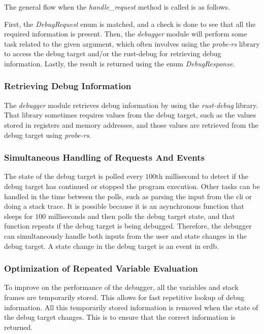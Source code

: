 The general flow when the \emph{handle\_request} method is called is as follows.


First, the \emph{DebugRequest} enum is matched, and a check is done to see that all the required information is present.
Then, the \emph{debugger} module will perform some task related to the given argument, which often involves using the \emph{probe-rs} library to access the debug target and/or the rust-debug for retrieving debug information.
Lastly, the result is returned using the enum \emph{DebugResponse}.



\subsubsection{Retrieving Debug Information}
The \emph{debugger} module retrieves debug information by using the \emph{rust-debug} library.
That library sometimes requires values from the debug target, such as the values stored in registers and memory addresses, and those values are retrieved from the debug target using \emph{probe-rs}.



\subsubsection{Simultaneous Handling of Requests And Events}
The state of the debug target is polled every $100\text{th}$ millisecond to detect if the debug target has continued or stopped the program execution.
Other tasks can be handled in the time between the polls, such as parsing the input from the \acrshort{cli} or doing a stack trace.
It is possible because it is an asynchronous function that sleeps for $100$ milliseconds and then polls the debug target state, and that function repeats if the debug target is being debugged.
Therefore, the debugger can simultaneously handle both inputs from the user and state changes in the debug target.
A state change in the debug target is an event in \gls{erdb}.



\subsubsection{Optimization of Repeated Variable Evaluation}
To improve on the performance of the debugger, all the variables and stack frames are temporarily stored.
This allows for fast repetitive lookup of debug information.
All this temporarily stored information is removed when the state of the debug target changes.
This is to ensure that the correct information is returned.


